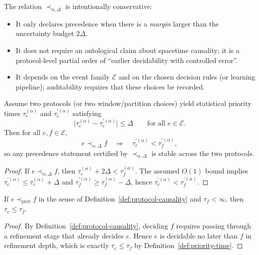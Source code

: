 \begin{remark}\label{rem:prec-alpha-delta}
The relation $\prec_{\alpha,\Delta}$ is intentionally conservative:
\begin{itemize}[leftmargin=*,itemsep=2pt]
  \item It only declares precedence when there is a \emph{margin} larger than the uncertainty budget $2\Delta$.
  \item It does not require an ontological claim about spacetime causality; it is a protocol-level partial order of ``earlier decidability with controlled error''.
  \item It depends on the event family $\mathcal{E}$ and on the chosen decision rules (or learning pipeline); auditability requires that these choices be recorded.
\end{itemize}
\end{remark}

\begin{proposition}\label{prop:prec-alpha-delta-invariant}
Assume two protocols (or two window/partition choices) yield statistical priority times $\tau^{(\alpha)}_e$ and $\tau^{\prime(\alpha)}_e$ satisfying
\[
\bigl|\tau^{(\alpha)}_e-\tau^{\prime(\alpha)}_e\bigr|\le \Delta
\qquad\text{for all }e\in\mathcal{E}.
\]
Then for all $e,f\in\mathcal{E}$,
\[
e\prec_{\alpha,\Delta} f\quad\Longrightarrow\quad \tau^{\prime(\alpha)}_e<\tau^{\prime(\alpha)}_f,
\]
so any precedence statement certified by $\prec_{\alpha,\Delta}$ is stable across the two protocols.
\end{proposition}

\begin{proof}
If $e\prec_{\alpha,\Delta} f$, then $\tau^{(\alpha)}_e+2\Delta<\tau^{(\alpha)}_f$. The assumed $O(1)$ bound implies
$\tau^{\prime(\alpha)}_e\le \tau^{(\alpha)}_e+\Delta$ and $\tau^{\prime(\alpha)}_f\ge \tau^{(\alpha)}_f-\Delta$, hence $\tau^{\prime(\alpha)}_e<\tau^{\prime(\alpha)}_f$.
\end{proof}

\begin{proposition}\label{prop:prot-implies-priority}
If $e\prec_{\mathrm{prot}} f$ in the sense of Definition~\ref{def:protocol-causality} and $\tau_f<\infty$, then $\tau_e\le \tau_f$.
\end{proposition}

\begin{proof}
By Definition~\ref{def:protocol-causality}, deciding $f$ requires passing through a refinement stage that already decides $e$. Hence $e$ is decidable no later than $f$ in refinement depth, which is exactly $\tau_e\le \tau_f$ by Definition~\ref{def:priority-time}.
\end{proof}

